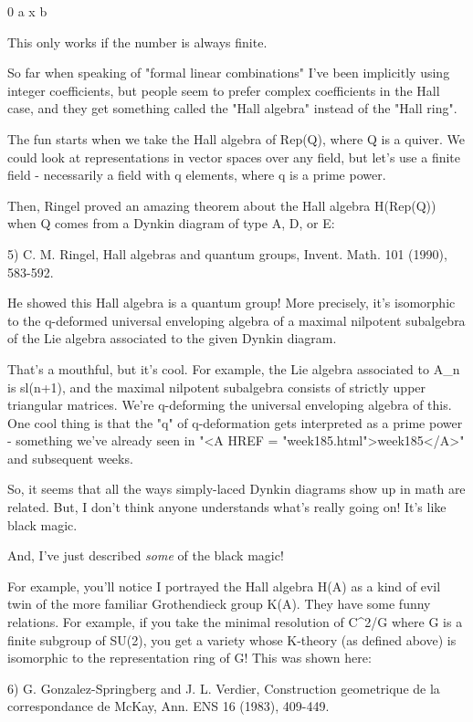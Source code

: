 0 \to  a \to  x \to  b 

This only works if the number is always finite.  

So far when speaking of "formal linear combinations" I've been 
implicitly using integer coefficients, but people seem to prefer 
complex coefficients in the Hall case, and they get something
called the "Hall algebra" instead of the "Hall ring".

The fun starts when we take the Hall algebra of Rep(Q), where
Q is a quiver.  We could look at representations in vector
spaces over any field, but let's use a finite field - necessarily 
a field with q elements, where q is a prime power.  

Then, Ringel proved an amazing theorem about the Hall algebra 
H(Rep(Q)) when Q comes from a Dynkin diagram of type A, D, or E:

5) C. M. Ringel, Hall algebras and quantum groups, Invent. Math. 101
(1990), 583-592.

He showed this Hall algebra is a quantum group!  More precisely, 
it's isomorphic to the q-deformed universal enveloping algebra 
of a maximal nilpotent subalgebra of the Lie algebra associated 
to the given Dynkin diagram.  

That's a mouthful, but it's cool.  For example, the Lie algebra 
associated to A_{n} is sl(n+1), and the maximal nilpotent subalgebra 
consists of strictly upper triangular matrices.   
We're q-deforming the universal enveloping algebra of this.  
One cool thing
is that the "q" of q-deformation gets interpreted
as a prime power - something we've already seen in "<A HREF = "week185.html">week185</A>" and subsequent weeks.

So, it seems that all the ways simply-laced Dynkin diagrams show
up in math are related.  But, I don't think anyone understands
what's really going on!  It's like black magic.  

And, I've just described \emph{some} of the black magic!  

For example, you'll notice I portrayed the Hall algebra H(A) 
as a kind of evil twin of the more familiar Grothendieck group K(A).  
They have some funny relations.  For example, if you take the minimal 
resolution of C^{2}/G where G is a finite subgroup of SU(2), you get a 
variety whose K-theory (as defined above) is isomorphic to the 
representation ring of G!  This was shown here:

6) G. Gonzalez-Springberg and J. L. Verdier, Construction geometrique
de la correspondance de McKay, Ann. ENS 16 (1983), 409-449.

